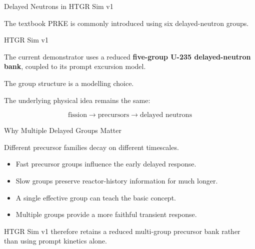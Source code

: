 \documentclass[aspectratio=169]{beamer}
\begin{document}
\begin{frame}{Delayed Neutrons in HTGR Sim v1}

    The textbook PRKE is commonly introduced using six delayed-neutron groups.

    \vspace{1em}

    \begin{block}{HTGR Sim v1}

        The current demonstrator uses a reduced
        \textbf{five-group U-235 delayed-neutron bank},
        coupled to its prompt excursion model.

    \end{block}

    \vspace{1em}

    The group structure is a modelling choice.

    The underlying physical idea remains the same:

    \[
        \text{fission}
        \rightarrow
        \text{precursors}
        \rightarrow
        \text{delayed neutrons}
    \]

\end{frame}



\begin{frame}{Why Multiple Delayed Groups Matter}

    Different precursor families decay on different timescales.

    \vspace{1em}

    \begin{itemize}

        \item Fast precursor groups influence the early delayed response.

        \item Slow groups preserve reactor-history information for much longer.

        \item A single effective group can teach the basic concept.

        \item Multiple groups provide a more faithful transient response.

    \end{itemize}

    \vspace{1em}

    HTGR Sim v1 therefore retains a reduced multi-group precursor bank rather
    than using prompt kinetics alone.

\end{frame}
\end{document}
